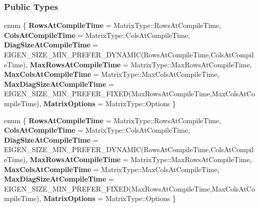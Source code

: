 \subsubsection*{Public Types}
\begin{DoxyCompactItemize}
\item 
\mbox{\label{group___s_v_d___module_a8e84161e9879b612a034dee6a4798031}} 
enum \{ \newline
{\bfseries Rows\+At\+Compile\+Time} = Matrix\+Type\+:\+:Rows\+At\+Compile\+Time, 
{\bfseries Cols\+At\+Compile\+Time} = Matrix\+Type\+:\+:Cols\+At\+Compile\+Time, 
{\bfseries Diag\+Size\+At\+Compile\+Time} = E\+I\+G\+E\+N\+\_\+\+S\+I\+Z\+E\+\_\+\+M\+I\+N\+\_\+\+P\+R\+E\+F\+E\+R\+\_\+\+D\+Y\+N\+A\+M\+IC(Rows\+At\+Compile\+Time,Cols\+At\+Compile\+Time), 
{\bfseries Max\+Rows\+At\+Compile\+Time} = Matrix\+Type\+:\+:Max\+Rows\+At\+Compile\+Time, 
\newline
{\bfseries Max\+Cols\+At\+Compile\+Time} = Matrix\+Type\+:\+:Max\+Cols\+At\+Compile\+Time, 
{\bfseries Max\+Diag\+Size\+At\+Compile\+Time} = E\+I\+G\+E\+N\+\_\+\+S\+I\+Z\+E\+\_\+\+M\+I\+N\+\_\+\+P\+R\+E\+F\+E\+R\+\_\+\+F\+I\+X\+ED(Max\+Rows\+At\+Compile\+Time,Max\+Cols\+At\+Compile\+Time), 
{\bfseries Matrix\+Options} = Matrix\+Type\+:\+:Options
 \}
\item 
\mbox{\label{group___s_v_d___module_a79c1184eb04ebf43d8bc019747fe2e3b}} 
enum \{ \newline
{\bfseries Rows\+At\+Compile\+Time} = Matrix\+Type\+:\+:Rows\+At\+Compile\+Time, 
{\bfseries Cols\+At\+Compile\+Time} = Matrix\+Type\+:\+:Cols\+At\+Compile\+Time, 
{\bfseries Diag\+Size\+At\+Compile\+Time} = E\+I\+G\+E\+N\+\_\+\+S\+I\+Z\+E\+\_\+\+M\+I\+N\+\_\+\+P\+R\+E\+F\+E\+R\+\_\+\+D\+Y\+N\+A\+M\+IC(Rows\+At\+Compile\+Time,Cols\+At\+Compile\+Time), 
{\bfseries Max\+Rows\+At\+Compile\+Time} = Matrix\+Type\+:\+:Max\+Rows\+At\+Compile\+Time, 
\newline
{\bfseries Max\+Cols\+At\+Compile\+Time} = Matrix\+Type\+:\+:Max\+Cols\+At\+Compile\+Time, 
{\bfseries Max\+Diag\+Size\+At\+Compile\+Time} = E\+I\+G\+E\+N\+\_\+\+S\+I\+Z\+E\+\_\+\+M\+I\+N\+\_\+\+P\+R\+E\+F\+E\+R\+\_\+\+F\+I\+X\+ED(Max\+Rows\+At\+Compile\+Time,Max\+Cols\+At\+Compile\+Time), 
{\bfseries Matrix\+Options} = Matrix\+Type\+:\+:Options
 \}
\item 
\mbox{\label{group___s_v_d___module_aee6fbe51774ff57b8446f0b14a4f34ac}} 

\end{DoxyCompactItemize}
